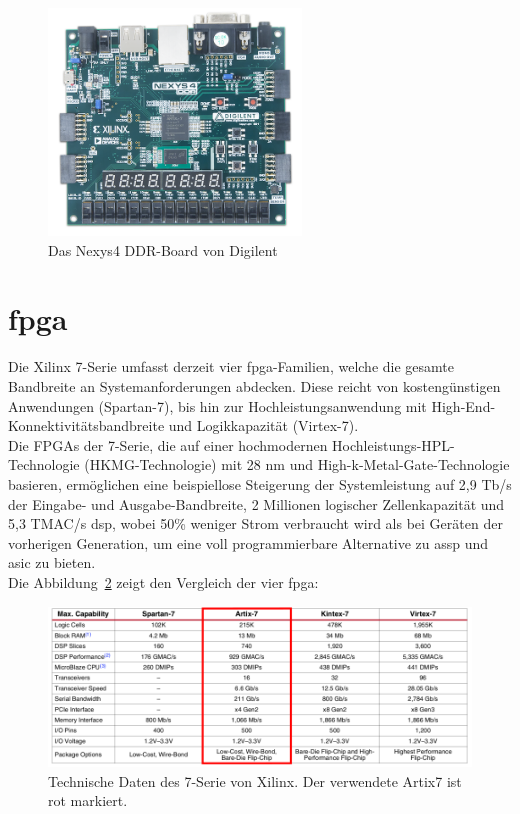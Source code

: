 \begin{figure}[H]
\centering
\includegraphics[width=0.6\textwidth]{Hauptteil/nexys-4-ddr-2.png}
\caption{Das Nexys4 DDR-Board von Digilent~\cite{digilent}}\label{fig:nexys4}
\end{figure}



\section{\acl{fpga}}\label{kap:fpga}
Die Xilinx 7-Serie umfasst derzeit vier \ac{fpga}-Familien, welche die gesamte Bandbreite an Systemanforderungen abdecken. Diese reicht von kostengünstigen Anwendungen (Spartan-7),
 bis hin zur Hochleistungsanwendung mit High-End-Konnektivitätsbandbreite und Logikkapazität (Virtex-7). \\
Die FPGAs der 7-Serie, die auf einer hochmodernen Hochleistungs-HPL-Technologie (HKMG-Technologie) mit 28 nm und High-k-Metal-Gate-Technologie basieren,
 ermöglichen eine beispiellose Steigerung der Systemleistung auf 2,9 Tb/s der Eingabe- und Ausgabe-Bandbreite, 2 Millionen logischer Zellenkapazität und 5,3 TMAC/s \ac{dsp},
 wobei 50\% weniger Strom verbraucht wird als bei Geräten der vorherigen Generation, um eine voll programmierbare Alternative zu \ac{assp} und \ac{asic} zu bieten.\\
 Die Abbildung~\ref{fig:7serie} zeigt den Vergleich der vier \ac{fpga}:~\cite{artix7}\\

 \begin{figure}[H]
 \centering
 \includegraphics[width=1\textwidth]{Hauptteil/7serie.png}
 \caption{Technische Daten des 7-Serie von Xilinx. Der verwendete Artix7 ist rot markiert.~\cite{artix7}}\label{fig:7serie}
 \end{figure}


